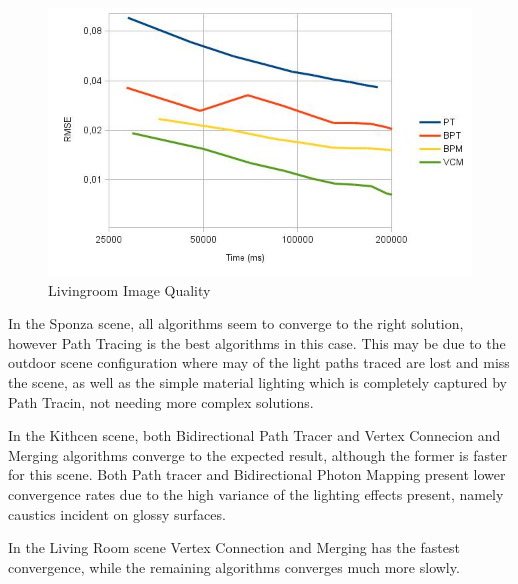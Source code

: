 \begin{figure}[H]
\includegraphics[width=\linewidth]{img/livingroomImgq.jpg}
\caption{\label{img:livingroomImgq} Livingroom Image Quality}
\end{figure}

In the Sponza scene, all algorithms seem to converge to the right solution, however Path Tracing is the best algorithms in this case. This may be due to the outdoor scene configuration where may of the light paths traced are lost and miss the scene, as well as the simple material lighting which is completely captured by Path Tracin, not needing more complex solutions.

In the Kithcen scene, both Bidirectional Path Tracer and Vertex Connecion and Merging algorithms converge to the expected result, although the former is faster for this scene. Both Path tracer and Bidirectional Photon Mapping present lower convergence rates due to the high variance of the lighting effects present, namely caustics incident on glossy surfaces.

In the Living Room scene Vertex Connection and Merging has the fastest convergence, while the remaining algorithms converges much more slowly.
